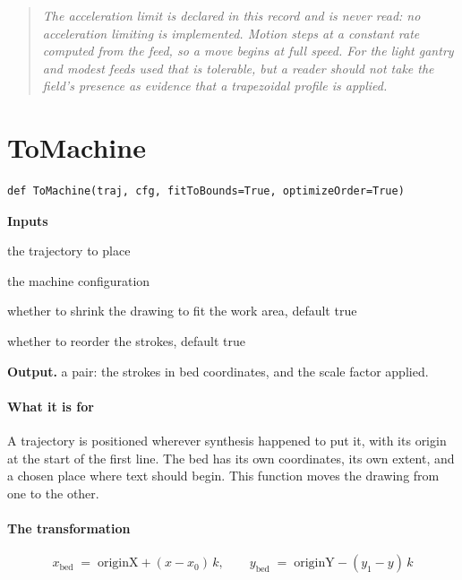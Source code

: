 \begin{quote}\small\itshape The acceleration limit is declared in this record and is never read: no acceleration limiting is implemented. Motion steps at a constant rate computed from the feed, so a move begins at full speed. For the light gantry and modest feeds used that is tolerable, but a reader should not take the field's presence as evidence that a trapezoidal profile is applied.\end{quote}

\section{ToMachine}
\begin{lstlisting}[style=sig]
def ToMachine(traj, cfg, fitToBounds=True, optimizeOrder=True)
\end{lstlisting}

\noindent\textbf{Inputs}
\begin{description}[leftmargin=2.2em,style=nextline,font=\normalfont\ttfamily]\setlength\itemsep{1pt}
  \item[{traj}] \normalfont the trajectory to place
  \item[{cfg}] \normalfont the machine configuration
  \item[{fitToBounds}] \normalfont whether to shrink the drawing to fit the work area, default true
  \item[{optimizeOrder}] \normalfont whether to reorder the strokes, default true
\end{description}

\noindent\textbf{Output.} a pair: the strokes in bed coordinates, and the scale factor applied.


\paragraph{What it is for}
A trajectory is positioned wherever synthesis happened to put it, with its origin at the start of the first line. The bed has its own coordinates, its own extent, and a chosen place where text should begin. This function moves the drawing from one to the other.


\paragraph{The transformation}

\begin{equation}
x_{\mathrm{bed}} \;=\; \mathrm{originX} + (x - x_0)\,k, \qquad y_{\mathrm{bed}} \;=\; \mathrm{originY} - (y_1 - y)\,k
\end{equation}

